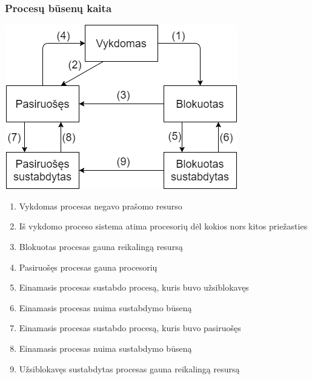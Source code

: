 \documentclass{scrartcl}
\begin{document}
      \subsubsection{Procesų būsenų kaita}
        \begin{center}
          \includegraphics[scale=0.7]{Process_state}
        \end{center}
        \begin{enumerate}
          \item Vykdomas procesas negavo prašomo resurso
          \item Iš vykdomo proceso sistema atima procesorių dėl kokios nors kitos priežasties
          \item Blokuotas procesas gauna reikalingą resursą
          \item Pasiruošęs procesas gauna procesorių
          \item Einamasis procesas sustabdo procesą, kuris buvo užsiblokavęs
          \item Einamasis procesas nuima sustabdymo būseną
          \item Einamasis procesas sustabdo procesą, kuris buvo pasiruošęs
          \item Einamasis procesas nuima sustabdymo būseną
          \item Užsiblokavęs sustabdytas procesas gauna reikalingą resursą
        \end{enumerate}
\end{document}
